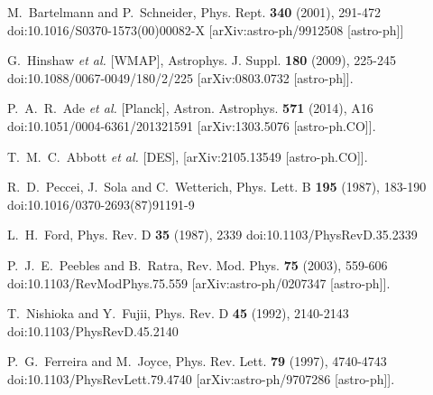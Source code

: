 \documentclass[a4paper,12pt]{article}
\begin{document}
\begin{thebibliography}{99}
M.~Bartelmann and P.~Schneider,
Phys. Rept. \textbf{340} (2001), 291-472
doi:10.1016/S0370-1573(00)00082-X
[arXiv:astro-ph/9912508 [astro-ph]]
		
		
G.~Hinshaw \textit{et al.} [WMAP],
Astrophys. J. Suppl. \textbf{180} (2009), 225-245
doi:10.1088/0067-0049/180/2/225
[arXiv:0803.0732 [astro-ph]].
		
		
P.~A.~R.~Ade \textit{et al.} [Planck],
Astron. Astrophys. \textbf{571} (2014), A16
doi:10.1051/0004-6361/201321591
[arXiv:1303.5076 [astro-ph.CO]].


T.~M.~C.~Abbott \textit{et al.} [DES],
[arXiv:2105.13549 [astro-ph.CO]].





				
		
R.~D.~Peccei, J.~Sola and C.~Wetterich,
Phys. Lett. B \textbf{195} (1987), 183-190
doi:10.1016/0370-2693(87)91191-9
		
L.~H.~Ford,
Phys. Rev. D \textbf{35} (1987), 2339
doi:10.1103/PhysRevD.35.2339
		
P.~J.~E.~Peebles and B.~Ratra,
Rev. Mod. Phys. \textbf{75} (2003), 559-606
doi:10.1103/RevModPhys.75.559
[arXiv:astro-ph/0207347 [astro-ph]].
		
T.~Nishioka and Y.~Fujii,
Phys. Rev. D \textbf{45} (1992), 2140-2143
doi:10.1103/PhysRevD.45.2140
		
P.~G.~Ferreira and M.~Joyce,
Phys. Rev. Lett. \textbf{79} (1997), 4740-4743
doi:10.1103/PhysRevLett.79.4740
[arXiv:astro-ph/9707286 [astro-ph]].
		

\end{thebibliography}
\end{document}
